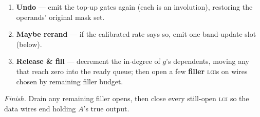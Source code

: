 \documentclass[11pt]{article}
\newcommand{\lgi}{\textsc{lgi}}
\begin{document}
\begin{enumerate}
  away from every band wire of the operands' polynomials (opened before the
  first monomial, closed after the last; the straddle open is drawn away from
  those wires too): a band wire shared between one of $c$'s masks and a fire
  monomial would cancel or fold that mask's uniform term and leave the mid-fire
  segments biased toward $c_{\mathrm{new}}$ (\S5.7; ${\sim}6$ gates per fire,
  ${\approx}3\%$).
\item \textbf{Undo} --- emit the top-up gates again (each is an involution),
  restoring the operands' original mask set.
\item \textbf{Maybe rerand} --- if the calibrated rate says so, emit one
  band-update slot (below).
\item \textbf{Release \& fill} --- decrement the in-degree of $g$'s dependents,
  moving any that reach zero into the ready queue; then open a few \textbf{filler}
  \lgi s on wires chosen by remaining filler budget.
\end{enumerate}

\emph{Finish.} Drain any remaining filler opens, then close every still-open
\lgi{} so the data wires end holding $A$'s true output.
\end{document}

